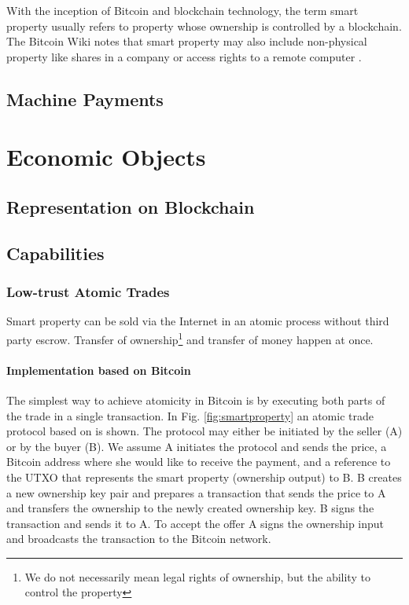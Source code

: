 With the inception of Bitcoin and blockchain technology, the term smart property usually refers to property whose ownership is controlled by a blockchain.
The Bitcoin Wiki notes that smart property may also include non-physical property like shares in a company or access rights to a remote computer \parencite{smartproperty2011}. 

\subsection{Machine Payments}

\section{Economic Objects}

\subsection{Representation on Blockchain}

\subsection{Capabilities}

\subsubsection{Low-trust Atomic Trades}


Smart property can be sold via the Internet in an atomic process without third party escrow. Transfer of ownership\footnote{We do not necessarily mean legal rights of ownership, but the ability to control the property} and transfer of money happen at once.

\paragraph{Implementation based on Bitcoin}

The simplest way to achieve atomicity in Bitcoin is by executing both parts of the trade in a single transaction. In Fig. \ref{fig:smartproperty} an atomic trade protocol based on \cite{smartproperty2011} is shown. The protocol may either be initiated by the seller (A) or by the buyer (B). We assume A initiates the protocol and sends the price, a Bitcoin address where she would like to receive the payment, and a reference to the UTXO that represents the smart property (ownership output) to B. B creates a new ownership key pair and prepares a transaction that sends the price to A and transfers the ownership to the newly created ownership key. B signs the transaction and sends it to A. To accept the offer A signs the ownership input and broadcasts the transaction to the Bitcoin network. 


